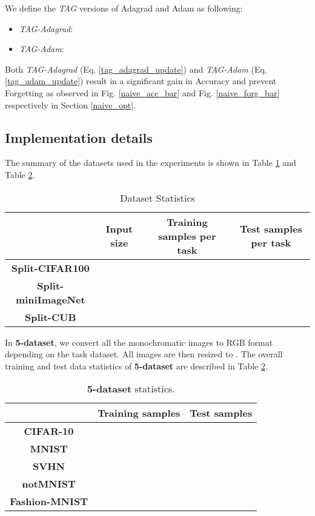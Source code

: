 \documentclass{article} \usepackage{collas2022_conference,times}
\begin{document}
We define the \textit{TAG} versions of Adagrad and Adam as following: 
    \begin{itemize}
        \item \textit{TAG-Adagrad}:
    
    \item \textit{TAG-Adam}:
     
    \end{itemize}
Both \textit{TAG-Adagrad} (Eq. \ref{tag_adagrad_update}) and \textit{TAG-Adam} (Eq. \ref{tag_adam_update}) result in a significant gain in Accuracy and prevent Forgetting as observed in Fig. \ref{naive_acc_bar} and Fig. \ref{naive_forg_bar} respectively in Section \ref{naive_opt}.

\subsection{Implementation details}\label{exp_details}

The summary of the datasets used in the experiments is shown in Table \ref{data_stats} and Table \ref{5data_stats}.
    
\begin{table}[h!]
    \caption{Dataset Statistics}
    \vskip 0.1in
    \centering
    \begin{tabular}{c c c c}
        \hline
        & \textbf{Input size} & \textbf{Training samples per task} & \textbf{Test samples per task} \\
        \hline
        \textbf{Split-CIFAR100} &  &  &  \\
        \textbf{Split-miniImageNet} &  &  &  \\
        \textbf{Split-CUB}  &  &  &  \\
        \hline
    \end{tabular}
    \label{data_stats}
\end{table}    
    


In \textbf{5-dataset}, we convert all the monochromatic images to RGB format depending on the task dataset. All images are then resized to . The overall training and test data statistics of \textbf{5-dataset} are described in Table \ref{5data_stats}.

\begin{table}[h!]
    \caption{\textbf{5-dataset} statistics.}
    \vskip 0.1in
    \centering
    \begin{tabular}{c c c}
        \hline
        & \textbf{Training samples} & \textbf{Test samples} \\
        \hline
        \textbf{CIFAR-10}  &  &  \\
        \textbf{MNIST}  &  &  \\
        \textbf{SVHN}  &  &  \\
        \textbf{notMNIST}  &  &  \\
        \textbf{Fashion-MNIST} &  &  \\
        \hline
    \end{tabular}\label{5data_stats}
\end{table}
\end{document}
